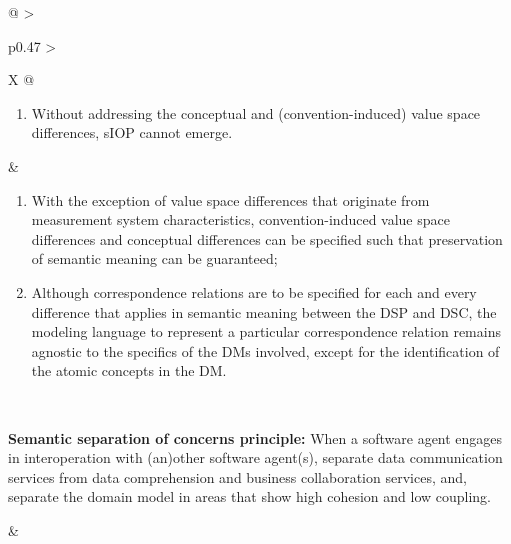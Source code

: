 \begin{xltabular}[l]{\linewidth}{@{} >{\small\raggedright\arraybackslash}p{0.47\linewidth} >{\small\raggedright\arraybackslash}X @{}}
\begin{enumerate}[left=6pt, nosep]
\begin{enumerate}
    \item meta-properties of the relation between the concepts, then the DSC is allowed to infer SoA that are not warranted by its premises;
    \item constraints to falsify possible interpretations, then the DSC allows SoA that are not intended by the DSP; 
    \item units of measurement, then the DSC allows the Mars Climate Orbiter to crash into the Martian atmosphere \cite{Leveson2004};
    \item lower value scale resolution, then the value masks distinctions that the DSC can comprehend as a different SoA than it will act upon;
    \item distinctions between ordinal, interval and ratio scales allows the DSC to make comparisons between incomparable values, resulting in invalid pragmatic meaning;
  \end{enumerate}
  \item Without addressing the conceptual and (convention-induced) value space differences, sIOP cannot emerge.
\end{enumerate}
&
\begin{enumerate}[left=10pt, nosep]
  \item With the exception of value space differences that originate from measurement system characteristics, convention-induced value space differences and conceptual differences can be specified such that preservation of semantic meaning can be guaranteed;
  \item Although correspondence relations are to be specified for each and every difference that applies in semantic meaning between the DSP and DSC, the modeling language to represent a particular correspondence relation remains agnostic to the specifics of the DMs involved, except for the identification of the atomic concepts in the DM.
\end{enumerate} \\
%
%
%
\begin{mmdp}\label{dp:ssoc}{\bfseries Semantic separation of concerns principle:}
\quad When a software agent engages in interoperation with (an)other software agent(s), separate data communication services from data comprehension and business collaboration services, and, separate the domain model in areas that show high cohesion and low coupling. \end{mmdp}
&
\begin{description}[labelwidth=3.7cm,leftmargin=3.7cm+1ex,nosep,topsep=2ex,labelsep=1ex,font=\bfseries]

\end{description}
\end{xltabular}
